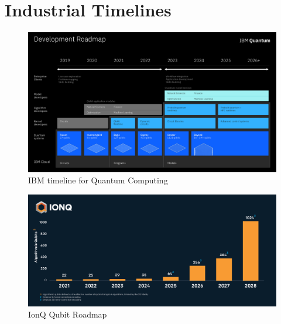 \documentclass{article}
\theoremstyle{definition}
\begin{document}
\section{Industrial Timelines}
\begin{figure}[htb]
    \centering
    \includegraphics[scale=0.1]{50863431103_aa832db592_o.jpg}
    \caption{IBM timeline for Quantum Computing \cite{wehden_faro_gambetta_2021} }
    \label{fig:ibm_timeline}
\end{figure}

\begin{figure}[htb]
    \centering
    \includegraphics[scale=0.1]{IonQ-roadmap-20201208.jpg}
    \caption{IonQ Qubit Roadmap}
    \label{fig:IonW_timeline}
\end{figure}
\end{document}
